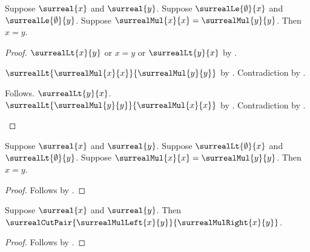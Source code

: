 \begin{theorem}\label{surreal_nonnegative_square_unique}
    Suppose $\surreal{x}$ and $\surreal{y}$.
    Suppose $\surrealLe{\emptyset}{x}$ and
        $\surrealLe{\emptyset}{y}$.
    Suppose $\surrealMul{x}{x}=\surrealMul{y}{y}$.
    Then $x=y$.
\end{theorem}
\begin{proof}
    $\surrealLt{x}{y}$ or $x=y$ or $\surrealLt{y}{x}$
        by .
    \begin{byCase}
            $\surrealLt{\surrealMul{x}{x}}{\surrealMul{y}{y}}$
                by .
            Contradiction by
                .
            \begin{byCase}
                    Follows.
                    $\surrealLt{y}{x}$.
                    $\surrealLt{\surrealMul{y}{y}}{\surrealMul{x}{x}}$
                        by
                        .
                    Contradiction by
                        .
            \end{byCase}
    \end{byCase}
\end{proof}

\begin{corollary}\label{surreal_positive_square_unique}
    Suppose $\surreal{x}$ and $\surreal{y}$.
    Suppose $\surrealLt{\emptyset}{x}$ and
        $\surrealLt{\emptyset}{y}$.
    Suppose $\surrealMul{x}{x}=\surrealMul{y}{y}$.
    Then $x=y$.
\end{corollary}
\begin{proof}
    Follows by
        .
\end{proof}

\begin{corollary}\label{surreal_mul_cut_pair}
    Suppose $\surreal{x}$ and $\surreal{y}$.
    Then $\surrealCutPair{\surrealMulLeft{x}{y}}
        {\surrealMulRight{x}{y}}$.
\end{corollary}
\begin{proof}
    Follows by .
\end{proof}
